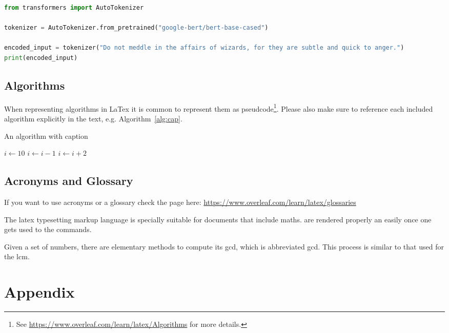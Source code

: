 \documentclass[a4paper,fontsize=12pt,listof=totoc,bibliography=totoc]{scrbook}
\begin{document}
\begin{lstlisting}[language=Python,caption={Python example}]
from transformers import AutoTokenizer

tokenizer = AutoTokenizer.from_pretrained("google-bert/bert-base-cased")

encoded_input = tokenizer("Do not meddle in the affairs of wizards, for they are subtle and quick to anger.")
print(encoded_input)

\end{lstlisting}

\section{Algorithms}
When representing algorithms in LaTex it is common to represent them as pseudcode\footnote{See \url{https://www.overleaf.com/learn/latex/Algorithms} for more details.}. Please also make sure to reference each included algorithm explicitly in the text, e.g. Algorithm~\ref{alg:cap}.

\begin{algorithm}
\caption{An algorithm with caption}\label{alg:cap}
\begin{algorithmic}
\State $i \gets 10$
    \State $i \gets i-1$
\Else
        \State $i \gets i+2$
    \EndIf
\EndIf 
\end{algorithmic}
\end{algorithm}

\section{Acronyms and Glossary}

If you want to use acronyms or a glossary check the page here: \url{https://www.overleaf.com/learn/latex/glossaries}

The \Gls{latex} typesetting markup language is specially suitable 
for documents that include \gls{maths}. are 
rendered properly an easily once one gets used to the commands.

Given a set of numbers, there are elementary methods to compute 
its \acrlong{gcd}, which is abbreviated \acrshort{gcd}. This 
process is similar to that used for the \acrfull{lcm}.






\printglossary[type=\acronymtype]
\printglossary

\cleardoublepage{}
\pagebreak
	
\appendix{}

\chapter{Appendix}
	
\end{document}
